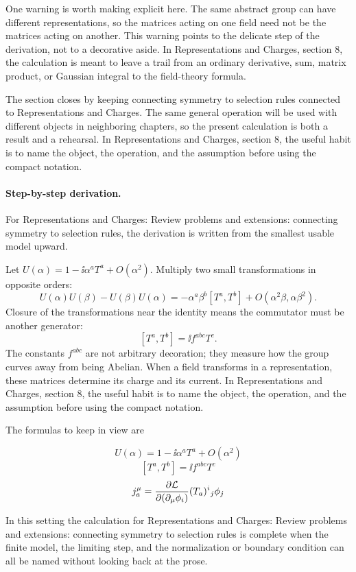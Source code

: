 One warning is worth making explicit here.  The same abstract group can have different representations, so the matrices acting on one field need not be the matrices acting on another.  This warning points to the delicate step of the derivation, not to a decorative aside.  In Representations and Charges, section 8, the calculation is meant to leave a trail from an ordinary derivative, sum, matrix product, or Gaussian integral to the field-theory formula.

The section closes by keeping connecting symmetry to selection rules connected to Representations and Charges.  The same general operation will be used with different objects in neighboring chapters, so the present calculation is both a result and a rehearsal.  In Representations and Charges, section 8, the useful habit is to name the object, the operation, and the assumption before using the compact notation.



\paragraph{Step-by-step derivation.}

For Representations and Charges: Review problems and extensions: connecting symmetry to selection rules, the derivation is written from the smallest usable model upward.

Let \(U(\alpha)=1-\ii\alpha^aT^a+O(\alpha^2)\).  Multiply two small transformations in opposite orders:
\[
  U(\alpha)U(\beta)-U(\beta)U(\alpha)
  =
  -\alpha^a\beta^b[T^a,T^b]+O(\alpha^2\beta,\alpha\beta^2).
\]
Closure of the transformations near the identity means the commutator must be another generator:
\[
  [T^a,T^b]=\ii f^{abc}T^c.
\]
The constants \(f^{abc}\) are not arbitrary decoration; they measure how the group curves away from being Abelian.  When a field transforms in a representation, these matrices determine its charge and its current.  In Representations and Charges, section 8, the useful habit is to name the object, the operation, and the assumption before using the compact notation.

The formulas to keep in view are

\[
  U(\alpha)=1-\ii\alpha^aT^a+O(\alpha^2)
\]
\[
  [T^a,T^b]=\ii f^{abc}T^c
\]
\[
  j^\mu_a=\frac{\partial\mathcal L}{\partial(\partial_\mu\phi_i)}(T_a)^i{}_j\phi_j
\]

In this setting the calculation for Representations and Charges: Review problems and extensions: connecting symmetry to selection rules is complete when the finite model, the limiting step, and the normalization or boundary condition can all be named without looking back at the prose.




